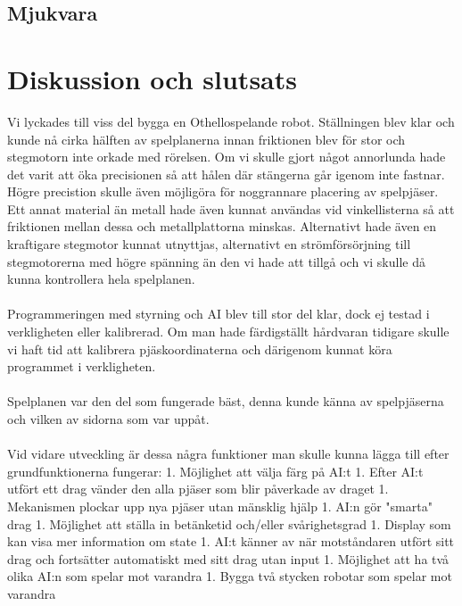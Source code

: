 \documentclass[a4paper]{article}
\begin{document}
\subsection{Mjukvara}


\section{Diskussion och slutsats}
Vi lyckades till viss del bygga en Othellospelande robot. Ställningen blev klar och kunde nå cirka hälften av spelplanerna innan friktionen blev för stor och stegmotorn inte orkade med rörelsen. Om vi skulle gjort något annorlunda hade det varit att öka precisionen så att hålen där stängerna går igenom inte fastnar. Högre precistion skulle även möjligöra för noggrannare placering av spelpjäser. Ett annat material än metall hade även kunnat användas vid vinkellisterna så att friktionen mellan dessa och metallplattorna minskas. Alternativt hade även en kraftigare stegmotor kunnat utnyttjas, alternativt en strömförsörjning till stegmotorerna med högre spänning än den vi hade att tillgå och vi skulle då kunna kontrollera hela spelplanen.
\\
\\
Programmeringen med styrning och AI blev till stor del klar, dock ej testad i verkligheten eller kalibrerad. Om man hade färdigställt hårdvaran tidigare skulle vi haft tid att kalibrera pjäskoordinaterna och därigenom kunnat köra programmet i verkligheten. 
\\
\\
Spelplanen var den del som fungerade bäst, denna kunde känna av spelpjäserna och vilken av sidorna som var uppåt.
\\
\\
Vid vidare utveckling är dessa några funktioner man skulle kunna lägga till efter grundfunktionerna fungerar: 
1. Möjlighet att välja färg på AI:t
1. Efter AI:t utfört ett drag vänder den alla pjäser som blir påverkade av draget
1. Mekanismen plockar upp nya pjäser utan mänsklig hjälp
1. AI:n gör "smarta" drag
1. Möjlighet att ställa in betänketid och/eller svårighetsgrad
1. Display som kan visa mer information om state
1. AI:t känner av när motståndaren utfört sitt drag och fortsätter automatiskt med sitt drag utan input
1. Möjlighet att ha två olika AI:n som spelar mot varandra
1. Bygga två stycken robotar som spelar mot varandra
\end{document}
